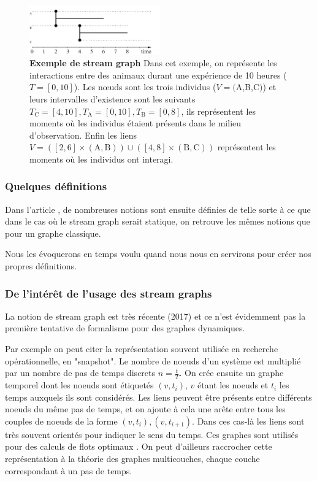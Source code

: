 \documentclass[11pt,a4paper]{article}
\theoremstyle{definition}
\theoremstyle{remark}
\theoremstyle{remark}
\def \stg {stream graph}
\def \stgs {stream graphs}
\begin{document}
\begin{figure}[H]
\centering
\includegraphics[width=0.5\textwidth]{exStreamGraph.JPG}
\caption{\textbf{Exemple de \stg{}} Dans cet exemple, on représente les interactions entre des animaux durant une expérience de 10 heures ($T=[0,10]$). Les nœuds sont les trois individus ($V=($A,B,C$)$) et leurs intervalles d'existence sont les suivants $T_{\text{C}}=[4,10], T_{\text{A}}=[0,10], T_{\text{B}}=[0,8]$, ils représentent les moments où les individus étaient présents dans le milieu d'observation. Enfin les liens $V=([2,6]\times (\text{A},\text{B})) \cup ([4,8]\times(\text{B},\text{C}))$ représentent les moments où les individus ont interagi.}
\label{exstreamgraph}
\end{figure}




\subsubsection{Quelques définitions}

Dans l'article \cite{stream}, de nombreuses notions sont ensuite définies de telle sorte à ce que dans le cas où le \stg{} serait statique, on retrouve les mêmes notions que pour un graphe classique.

Nous les évoquerons en temps voulu quand nous nous en servirons pour créer nos propres définitions.

\subsubsection{De l'intérêt de l'usage des \stgs{}}
La notion de \stg{} est très récente (2017)\cite{stream} et ce n'est évidemment pas la première tentative de formalisme pour des graphes dynamiques.

Par exemple on peut citer la représentation souvent utilisée en recherche opérationnelle, en "snapshot". Le nombre de noeuds d'un système est multiplié par un nombre de pas de temps discrets $n=\frac{t}{T}$. On crée ensuite un graphe temporel dont les noeuds sont étiquetés $(v,t_i)$, $v$ étant les noeuds et $t_i$ les temps auxquels ils sont considérés. Les liens peuvent être présents entre différents noeuds du même pas de temps, et on ajoute à cela une arête entre tous les couples de noeuds de la forme $(v,t_i),(v,t_{i+1})$. 
Dans ces cas-là les liens sont très souvent orientés pour indiquer le sens du temps. Ces graphes sont utilisés pour des calculs de flots optimaux \cite{map}. On peut d'ailleurs raccrocher cette représentation à la théorie des graphes multicouches, chaque couche correspondant à un pas de temps.
\end{document}
